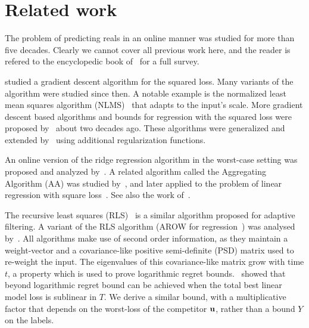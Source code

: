 \chapter{Related work}

The problem of predicting reals in an online manner was studied for more than five decades. Clearly we cannot cover all previous work here, and the reader
is refered to the encyclopedic book of~\cite{CesaBiGa06}
 for a full survey.

\cite{WidrowHoff} studied a gradient descent algorithm for the squared loss. Many variants of the algorithm were studied since then. A notable example is the normalized least mean squares algorithm (NLMS)~\citep{Bitmead,Bershad} that adapts to the input's scale. More gradient descent based algorithms and bounds for regression with the squared loss were proposed by~\cite{Nicolo_Warmuth} about two decades ago. These algorithms were generalized and extended by~\cite{Kiv_War} using additional regularization functions.

An online version of the ridge regression algorithm in the worst-case
setting was proposed and analyzed by~\cite{Foster91}. A related
algorithm called the Aggregating Algorithm (AA) was studied by~\cite{vovkAS}, and later applied to the problem of linear regression with square loss~\citep{Vovk97,Vovk01}. See also the work of~\cite{AzouryWa01}.


The recursive least squares (RLS)~\citep{Hayes} is a
similar algorithm proposed for adaptive filtering. A variant of the RLS algorithm (AROW for regression~\citep{VaitsCr11}) was analysed by~\cite{CrammerKuDr12}. All algorithms
make use of second order information, as they maintain a weight-vector
and a covariance-like positive semi-definite (PSD) matrix used to
re-weight the input. The eigenvalues of this covariance-like matrix
grow with time $t$, a property which is used to prove logarithmic
regret bounds.~\cite{OrabonaCBG12} showed
that beyond logarithmic regret bound can be achieved when the total
best linear model loss is sublinear in $T$. We derive a similar bound,
with a multiplicative factor that depends on the worst-loss of the competitor $\mathbf{u}$, rather than a bound $Y$ on the labels.

